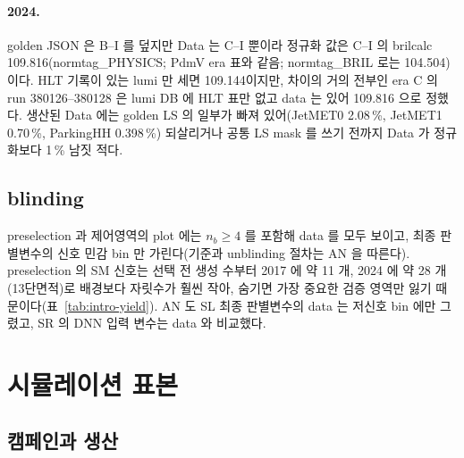 \paragraph{2024.} golden JSON 은 B--I 를 덮지만 Data 는 C--I 뿐이라 정규화 값은 C--I 의 brilcalc 109.816\fbinv(normtag\_PHYSICS; PdmV era 표와 같음; normtag\_BRIL 로는
104.504)이다. HLT 기록이 있는 lumi 만 세면  109.144\fbinv 이지만, 차이의 거의 전부인 era C 의 run 380126--380128 은 lumi DB 에
HLT 표만 없고 data 는 있어 109.816 으로 정했다. 생산된 Data 에는 golden LS 의 일부가 빠져 있어(JetMET0 2.08\,\%, JetMET1
0.70\,\%, ParkingHH 0.398\,\%) 되살리거나 공통 LS mask 를 쓰기 전까지 Data 가 정규화보다 1\,\% 남짓 적다.

\subsection{blinding}\label{sec:samples-blinding}

preselection 과 제어영역의 plot 에는 $n_b\geq4$ 를 포함해 data 를 모두 보이고, 최종 판별변수의 신호 민감 bin 만 가린다(기준과 unblinding 절차는 AN 을
따른다). preselection 의 SM 신호는 선택 전 생성 수부터 2017 에 약 11 개, 2024 에 약 28 개(13\TeV 단면적)로 배경보다 자릿수가 훨씬 작아, 숨기면 가장 중요한 검증
영역만 잃기 때문이다(표~\ref{tab:intro-yield}). AN 도 SL 최종 판별변수의 data 는 저신호 bin 에만 그렸고,
SR 의 DNN 입력 변수는 data 와 비교했다.

\section{시뮬레이션 표본}\label{sec:samples-mc}

\subsection{캠페인과 생산}\label{sec:samples-campaigns}

